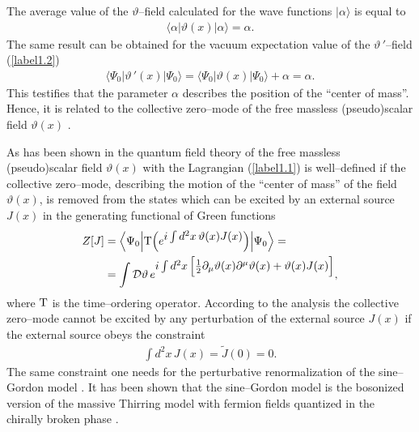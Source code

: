 \documentclass[a4paper,12pt] {article}
\begin{document}
The average value of the $\vartheta$--field calculated for the wave
functions $|\alpha\rangle$ is equal to
%
\begin{eqnarray}\label{label1.7}
\langle\alpha|\vartheta(x)|\alpha\rangle = \alpha.
\end{eqnarray}
%
The same result can be obtained for the vacuum expectation value
of the $\vartheta\,'$--field (\ref{label1.2})
%
\begin{eqnarray}\label{label1.8}
\langle \Psi_0|\vartheta\,'(x)|\Psi_0\rangle = \langle
\Psi_0|\vartheta(x)|\Psi_0\rangle + \alpha = \alpha.
\end{eqnarray}
%
This testifies that the parameter $\alpha$ describes the position of
the ``center of mass''. Hence, it is related to the collective
zero--mode of the free massless (pseudo)scalar field $\vartheta(x)$
\cite{th0112184,th0204237,th0206244}. 

As has been shown in \cite{th0112184,th0204237,th0206244} the quantum
field theory of the free massless (pseudo)scalar field $\vartheta(x)$
with the Lagrangian (\ref{label1.1}) is well--defined if the
collective zero--mode, describing the motion of the ``center of mass''
of the field $\vartheta(x)$, is removed from the states which can be
excited by an external source $J(x)$ in the generating functional of
Green functions \cite{th0112184,th0204237,th0206244}
%
\begin{eqnarray}\label{label1.9}
\begin{aligned}
Z[J] &= \Big\langle \Psi_0\Big|{\rm T}\Big(e^{\textstyle i\int
d^2x\,\vartheta(x)J(x)}\Big)\Big|\Psi_0\Big\rangle =\\
 &=\int {\cal D}\vartheta\,e^{\textstyle i\int
d^2x\,\Big[\frac{1}{2}\partial_{\mu}\vartheta(x)
\partial^{\mu}\vartheta(x) + \vartheta(x)J(x)\Big]},
\end{aligned}
\end{eqnarray}
%
where ${\rm T}$ is the time--ordering operator. According to the
analysis \cite{th0112184,th0204237,th0206244} the collective
zero--mode cannot be excited by any perturbation of the external
source $J(x)$ if the external source obeys the constraint
\cite{th0112184,th0204237,th0206244}
%
\begin{eqnarray}\label{label1.10}
\int d^2x\,J(x) = \tilde{J}(0) = 0.
\end{eqnarray}
%
The same constraint one needs for the perturbative renormalization of
the sine--Gordon model \cite{th0112183}. It has been shown that the
sine--Gordon model is the bosonized version of the massive Thirring
model with fermion fields quantized in the chirally broken phase
\cite{th0105057}.
\end{document}
